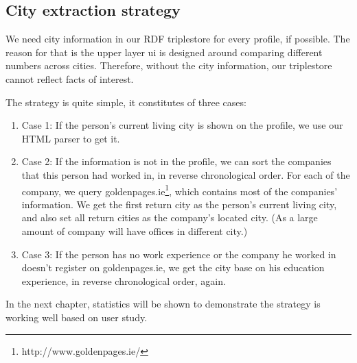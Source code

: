 \subsection{City extraction strategy}
We need city information in our RDF triplestore for every profile, if possible. The reason for that is the upper layer \acrlong{ui} is designed around comparing different numbers across cities. Therefore, without the city information, our triplestore cannot reflect facts of interest.

The strategy is quite simple, it constitutes of three cases:
\begin{enumerate}
	\item Case 1: If the person's current living city is shown on the profile, we use our HTML parser to get it.
	\item Case 2: If the information is not in the profile, we can sort the companies that this person had worked in, in reverse chronological order. For each of the company, we query goldenpages.ie\footnote{http://www.goldenpages.ie/}, which contains most of the companies' information. We get the first return city as the person's current living city, and also set all return cities as the company's located city. (As a large amount of company will have offices in different city.)
	\item Case 3: If the person has no work experience or the company he worked in doesn't register on goldenpages.ie, we get the city base on his education experience, in reverse chronological order, again.
\end{enumerate}

In the next chapter, statistics will be shown to demonstrate the strategy is working well based on user study.